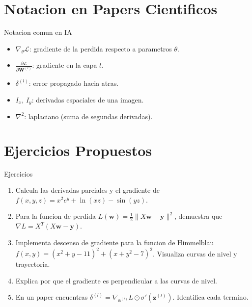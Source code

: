 \documentclass[aspectratio=169, 10pt, xcolor=table]{beamer}
\begin{document}
\section{Notacion en Papers Cientificos}

\begin{frame}{Notacion comun en IA}
    \begin{itemize}
        \item $\nabla_\theta \mathcal{L}$: gradiente de la perdida respecto a parametros $\theta$.
        \item $\frac{\partial \mathcal{L}}{\partial \mathbf{W}^{(l)}}$: gradiente en la capa $l$.
        \item $\delta^{(l)}$: error propagado hacia atras.
        \item $I_x$, $I_y$: derivadas espaciales de una imagen.
        \item $\nabla^2$: laplaciano (suma de segundas derivadas).
    \end{itemize}
\end{frame}

\section{Ejercicios Propuestos}

\begin{frame}{Ejercicios}
    \begin{enumerate}
        \item Calcula las derivadas parciales y el gradiente de $f(x,y,z)=x^2 e^y + \ln(xz) - \sin(yz)$.
        \item Para la funcion de perdida $L(\mathbf{w}) = \frac{1}{2}\|X\mathbf{w}-\mathbf{y}\|^2$, demuestra que $\nabla L = X^T(X\mathbf{w}-\mathbf{y})$.
        \item Implementa descenso de gradiente para la funcion de Himmelblau $f(x,y)=(x^2+y-11)^2+(x+y^2-7)^2$. Visualiza curvas de nivel y trayectoria.
        \item Explica por que el gradiente es perpendicular a las curvas de nivel.
        \item En un paper encuentras $\delta^{(l)} = \nabla_{\mathbf{a}^{(l)}}L \odot \sigma'(\mathbf{z}^{(l)})$. Identifica cada termino.
    \end{enumerate}
\end{frame}
\end{document}
